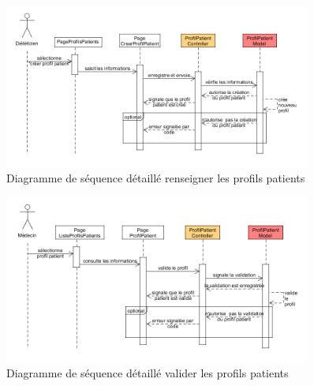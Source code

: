 \begin{figure}
  \label{diagramme-renseigner-les-profils-patients}
  \centering
  \includegraphics[width=0.9\textwidth]{../../CasDUtilisations/ProfilPatient/diagSrqDetaillProfilPatient.png}
  \caption{Diagramme de séquence détaillé renseigner les profils patients}
\end{figure}

\begin{figure}
  \label{diagramme-renseigner-les-profils-patients}
  \centering
  \includegraphics[width=0.9\textwidth]{../../CasDUtilisations/ProfilPatient/diagSrqDetaillValidProfilPatient.png}
  \caption{Diagramme de séquence détaillé valider les profils patients}
\end{figure}
